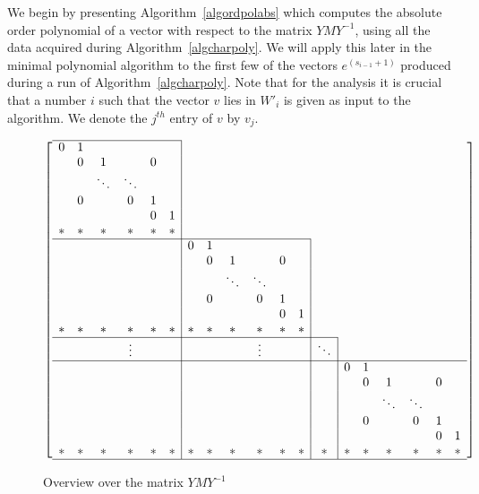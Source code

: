 We begin by presenting Algorithm~\ref{algordpolabs} which computes the
absolute order polynomial of a vector with respect to the matrix $YMY^{-1}$,
using all the data acquired during Algorithm~\ref{algcharpoly}. 
We will apply this later
in the minimal polynomial algorithm to the first few of the vectors 
$e^{(s_{i-1}+1)}$ 
produced during a run of Algorithm~\ref{algcharpoly}. Note that for 
the analysis it is crucial that a number $i$ such that
the vector $v$ lies in $W'_i$ is given as input to the algorithm.
We denote the $j^{th}$ entry of $v$ by $v_j$.

\begin{figure}
\[ \left[ \begin{array}{cccccc|cccccc|c|cccccc}
\cline{1-6}
  0 & 1 &      &      &   &   \\
    & 0 & 1    &      & 0 &   \\
    &   &\ddots&\ddots&   &   \\
    & 0 &      &   0  & 1 &   \\
    &   &      &      & 0 & 1 \\
  {}* & * &   *  &   *  & * & * \\
\cline{1-12}
  &&&&&& 0 & 1 &      &      &   &   \\
  &&&&&&  & 0 & 1    &      & 0 &   \\
  &&&&&&  &   &\ddots&\ddots&   &   \\
  &&&&&&  & 0 &      &   0  & 1 &   \\
  &&&&&&  &   &      &      & 0 & 1 \\
  {}*&*&*&*&*&*&* & * &   *  &   *  & * & * \\
\cline{1-13}
  &&&\vdots&&& &&&\vdots&&& \ddots \\
\cline{1-19}
  &&&&&& &&&&&& & 0 & 1 &      &      &   &   \\
  &&&&&& &&&&&& & & 0 & 1    &      & 0 &   \\
  &&&&&& &&&&&& & &   &\ddots&\ddots&   &   \\
  &&&&&& &&&&&& & & 0 &      &   0  & 1 &   \\
  &&&&&& &&&&&& & &   &      &      & 0 & 1 \\
  {}*&*&*&*&*&*& *&*&*&*&*&*&* &*& * &   *  &   *  & * & * \\
\hline
\end{array} \right] \]
\caption{Overview over the matrix $YMY^{-1}$}
\label{bigmat}
\end{figure}

